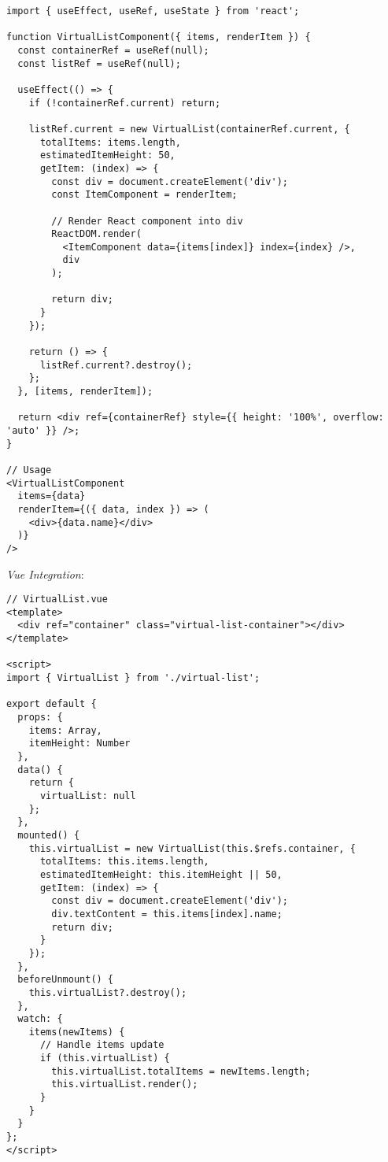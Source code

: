 \documentclass[11pt]{article}
\begin{document}
\begin{verbatim}
import { useEffect, useRef, useState } from 'react';

function VirtualListComponent({ items, renderItem }) {
  const containerRef = useRef(null);
  const listRef = useRef(null);
  
  useEffect(() => {
    if (!containerRef.current) return;
    
    listRef.current = new VirtualList(containerRef.current, {
      totalItems: items.length,
      estimatedItemHeight: 50,
      getItem: (index) => {
        const div = document.createElement('div');
        const ItemComponent = renderItem;
        
        // Render React component into div
        ReactDOM.render(
          <ItemComponent data={items[index]} index={index} />,
          div
        );
        
        return div;
      }
    });
    
    return () => {
      listRef.current?.destroy();
    };
  }, [items, renderItem]);
  
  return <div ref={containerRef} style={{ height: '100%', overflow: 'auto' }} />;
}

// Usage
<VirtualListComponent
  items={data}
  renderItem={({ data, index }) => (
    <div>{data.name}</div>
  )}
/>
\end{verbatim}

\emph{Vue Integration}:

\begin{verbatim}
// VirtualList.vue
<template>
  <div ref="container" class="virtual-list-container"></div>
</template>

<script>
import { VirtualList } from './virtual-list';

export default {
  props: {
    items: Array,
    itemHeight: Number
  },
  data() {
    return {
      virtualList: null
    };
  },
  mounted() {
    this.virtualList = new VirtualList(this.$refs.container, {
      totalItems: this.items.length,
      estimatedItemHeight: this.itemHeight || 50,
      getItem: (index) => {
        const div = document.createElement('div');
        div.textContent = this.items[index].name;
        return div;
      }
    });
  },
  beforeUnmount() {
    this.virtualList?.destroy();
  },
  watch: {
    items(newItems) {
      // Handle items update
      if (this.virtualList) {
        this.virtualList.totalItems = newItems.length;
        this.virtualList.render();
      }
    }
  }
};
</script>
\end{verbatim}
\end{document}
